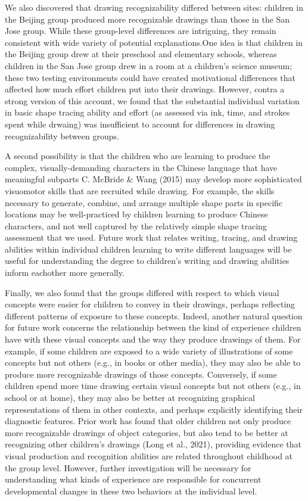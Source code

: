 \documentclass[
  man]{apa6}
\begin{document}
We also discovered that drawing recognizability differed between sites: children in the Beijing group produced more recognizable drawings than those in the San Jose group. While these group-level differences are intriguing, they remain consistent with wide variety of potential explanations.One idea is that children in the Beijing group drew at their preschool and elementary schools, whereas children in the San Jose group drew in a room at a children's science museum; these two testing environments could have created motivational differences that affected how much effort children put into their drawings. However, contra a strong version of this account, we found that the substantial individual variation in basic shape tracing ability and effort (as assessed via ink, time, and strokes spent while drwaing) was insufficient to account for differences in drawing recognizability between groups.

A second possibility is that the children who are learning to produce the complex, visually-demanding characters in the Chinese language that have meaningful subparts C. McBride \& Wang (2015) may develop more sophisticated visuomotor skills that are recruited while drawing. For example, the skills necessary to generate, combine, and arrange multiple shape parts in specific locations may be well-practiced by children learning to produce Chinese characters, and not well captured by the relatively simple shape tracing assessment that we used. Future work that relates writing, tracing, and drawing abilities within individual children learning to write different languages will be useful for understanding the degree to children's writing and drawing abilities inform eachother more generally.

Finally, we also found that the groups differed with respect to which visual concepts were easier for children to convey in their drawings, perhaps reflecting different patterns of exposure to these concepts.
Indeed, another natural question for future work concerns the relationship between the kind of experience children have with these visual concepts and the way they produce drawings of them. For example, if some children are exposed to a wide variety of illustrations of some concepts but not others (e.g., in books or other media), they may also be able to produce more recognizable drawings of those concepts. Conversely, if some children spend more time drawing certain visual concepts but not others (e.g., in school or at home), they may also be better at recognizing graphical representations of them in other contexts, and perhaps explicitly identifying their diagnostic features. Prior work has found that older children not only produce more recognizable drawings of object categories, but also tend to be better at recognizing other children's drawings (Long et al., 2021), providing evidence that visual production and recognition abilities are related throughout childhood at the group level. However, further investigation will be necessary for understanding what kinds of experience are responsible for concurrent developmental changes in these two behaviors at the individual level.
\end{document}
